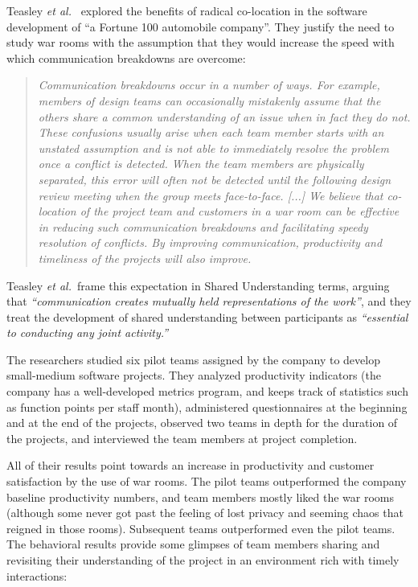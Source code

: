 Teasley \emph{et al.}\  explored the benefits of radical co-location in the software development of ``a Fortune 100 automobile company''. They justify the need to study war rooms with the assumption that they would increase the speed with which communication breakdowns are overcome:

\begin{quote}
\emph{Communication breakdowns occur in a number of ways. For example, members of design teams can occasionally mistakenly assume that the others share a common understanding of an issue when in fact they do not. These confusions usually arise when each team member starts with an unstated assumption and is not able to immediately resolve the problem once a conflict is detected. When the team members are physically separated, this error will often not be detected until the following design review meeting when the group meets face-to-face. [...] We believe that co-location of the project team and customers in a war room can be effective in reducing such communication breakdowns and facilitating speedy resolution of conflicts. By improving communication, productivity and timeliness of the projects will also improve.}
\end{quote}

Teasley \emph{et al.}\ frame this expectation in Shared Understanding terms, arguing that \emph{``communication creates mutually held representations of the work''}, and they treat the development of shared understanding between participants as \emph{``essential to conducting any joint activity.''}

The researchers studied six pilot teams assigned by the company to develop small-medium software projects. They analyzed productivity indicators (the company has a well-developed metrics program, and keeps track of statistics such as function points per staff month), administered questionnaires at the beginning and at the end of the projects, observed two teams in depth for the duration of the projects, and interviewed the team members at project completion.

All of their results point towards an increase in productivity and customer satisfaction by the use of war rooms. The pilot teams outperformed the company baseline productivity numbers, and team members mostly liked the war rooms (although some never got past the feeling of lost privacy and seeming chaos that reigned in those rooms). Subsequent teams outperformed even the pilot teams. The behavioral results provide some glimpses of team members sharing and revisiting their understanding of the project in an environment rich with timely interactions:


